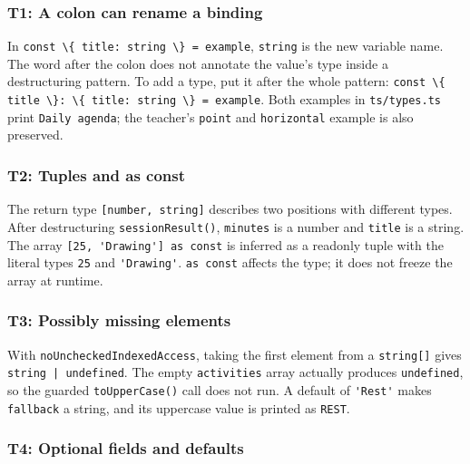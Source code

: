 \documentclass[
  11pt,
]{article}
\newcommand{\passthrough}[1]{#1}
\begin{document}
\subsubsection{T1: A colon can rename a
binding}\label{t1-a-colon-can-rename-a-binding}

In \passthrough{\lstinline!const \{ title: string \} = example!},
\passthrough{\lstinline!string!} is the new variable name. The word
after the colon does not annotate the value's type inside a
destructuring pattern. To add a type, put it after the whole pattern:
\passthrough{\lstinline!const \{ title \}: \{ title: string \} = example!}.
Both examples in \passthrough{\lstinline!ts/types.ts!} print
\passthrough{\lstinline!Daily agenda!}; the teacher's
\passthrough{\lstinline!point!} and \passthrough{\lstinline!horizontal!}
example is also preserved.

\subsubsection{T2: Tuples and as const}\label{t2-tuples-and-as-const}

The return type \passthrough{\lstinline![number, string]!} describes two
positions with different types. After destructuring
\passthrough{\lstinline!sessionResult()!},
\passthrough{\lstinline!minutes!} is a number and
\passthrough{\lstinline!title!} is a string. The array
\passthrough{\lstinline![25, 'Drawing'] as const!} is inferred as a
readonly tuple with the literal types \passthrough{\lstinline!25!} and
\passthrough{\lstinline!'Drawing'!}. \passthrough{\lstinline!as const!}
affects the type; it does not freeze the array at runtime.

\subsubsection{T3: Possibly missing
elements}\label{t3-possibly-missing-elements}

With \passthrough{\lstinline!noUncheckedIndexedAccess!}, taking the
first element from a \passthrough{\lstinline!string[]!} gives
\passthrough{\lstinline!string | undefined!}. The empty
\passthrough{\lstinline!activities!} array actually produces
\passthrough{\lstinline!undefined!}, so the guarded
\passthrough{\lstinline!toUpperCase()!} call does not run. A default of
\passthrough{\lstinline!'Rest'!} makes
\passthrough{\lstinline!fallback!} a string, and its uppercase value is
printed as \passthrough{\lstinline!REST!}.

\subsubsection{T4: Optional fields and
defaults}\label{t4-optional-fields-and-defaults}
\end{document}
